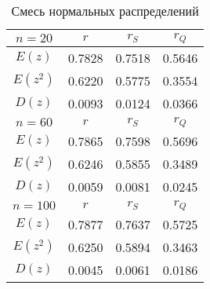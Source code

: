 	\begin{table}[H]
		\centering
		\begin{tabular}{| c | c | c | c |}

		\hline
		 $n = 20$   & $r$    & $r_{S}$ & $r_{Q}$ \\
		\hline
		 $E(z)$     & 0.7828 & 0.7518  & 0.5646  \\
		 $E(z^{2})$ & 0.6220 & 0.5775  & 0.3554  \\
		 $D(z)$     & 0.0093 & 0.0124  & 0.0366  \\
		\hline
		 $n = 60$   & $r$    & $r_{S}$ & $r_{Q}$ \\
		\hline
		 $E(z)$     & 0.7865 & 0.7598  & 0.5696  \\
		 $E(z^{2})$ & 0.6246 & 0.5855  & 0.3489  \\
		 $D(z)$     & 0.0059 & 0.0081  & 0.0245  \\
		\hline
		 $n = 100$  & $r$    & $r_{S}$ & $r_{Q}$ \\
		\hline
		 $E(z)$     & 0.7877 & 0.7637  & 0.5725  \\
		 $E(z^{2})$ & 0.6250 & 0.5894  & 0.3463  \\
		 $D(z)$     & 0.0045 & 0.0061  & 0.0186  \\
		\hline

		\end{tabular}{}
		\caption{Смесь нормальных распределений}
		\label{tab:mix_normal}
	\end{table}
